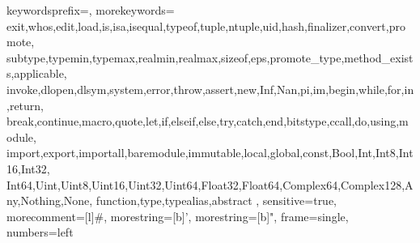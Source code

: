 \usepackage{listings}



{
  keywordsprefix=\@,
  morekeywords={
    exit,whos,edit,load,is,isa,isequal,typeof,tuple,ntuple,uid,hash,finalizer,convert,promote,
    subtype,typemin,typemax,realmin,realmax,sizeof,eps,promote_type,method_exists,applicable,
    invoke,dlopen,dlsym,system,error,throw,assert,new,Inf,Nan,pi,im,begin,while,for,in,return,
    break,continue,macro,quote,let,if,elseif,else,try,catch,end,bitstype,ccall,do,using,module,
    import,export,importall,baremodule,immutable,local,global,const,Bool,Int,Int8,Int16,Int32,
    Int64,Uint,Uint8,Uint16,Uint32,Uint64,Float32,Float64,Complex64,Complex128,Any,Nothing,None,
    function,type,typealias,abstract
  },
  sensitive=true,
  morecomment=[l]{\#},
  morestring=[b]',
  morestring=[b]",
  frame=single,
  numbers=left
}


